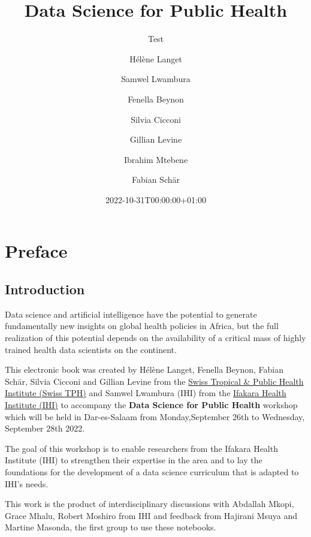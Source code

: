 \documentclass[
  letterpaper,
  DIV=11,
  numbers=noendperiod,
  oneside]{scrreprt}
\title{Data Science for Public Health}
\subtitle{Test}
\author{Hélène Langet \and Samwel Lwambura \and Fenella
Beynon \and Silvia Cicconi \and Gillian Levine \and Ibrahim
Mtebene \and Fabian Schär}
\date{2022-10-31T00:00:00+01:00}
\renewcommand*\contentsname{Table of contents}
\newcommand\contentsname{Table of contents}
\begin{document}
\maketitle
\ifdefined\Shaded\renewenvironment{Shaded}{\begin{tcolorbox}[borderline west={3pt}{0pt}{shadecolor}, frame hidden, breakable, boxrule=0pt, interior hidden, enhanced, sharp corners]}{\end{tcolorbox}}\fi

\renewcommand*\contentsname{Table of contents}
{
\hypersetup{linkcolor=}
\setcounter{tocdepth}{2}
\tableofcontents
}

\hypertarget{preface}{%
\chapter*{Preface}\label{preface}}

\hypertarget{introduction}{%
\section*{Introduction}\label{introduction}}

Data science and artificial intelligence have the potential to generate
fundamentally new insights on global health policies in Africa, but the
full realization of this potential depends on the availability of a
critical mass of highly trained health data scientists on the continent.

This electronic book was created by Hélène Langet, Fenella Beynon,
Fabian Schär, Silvia Cicconi and Gillian Levine from the
\href{https://www.swisstph.ch}{Swiss Tropical \& Public Health Institute
(Swiss TPH)} and Samwel Lwambura (IHI) from the
\href{https://ihi.or.tz/}{Ifakara Health Institute (IHI)} to accompany
the \textbf{Data Science for Public Health} workshop which will be held
in Dar-es-Salaam from Monday,September 26th to Wednesday, September 28th
2022.

The goal of this workshop is to enable researchers from the Ifakara
Health Institute (IHI) to strengthen their expertise in the area and to
lay the foundations for the development of a data science curriculum
that is adapted to IHI's needs.

This work is the product of interdisciplinary discussions with Abdallah
Mkopi, Grace Mhalu, Robert Moshiro from IHI and feedback from Hajirani
Msuya and Martine Masonda, the first group to use these notebooks.
\end{document}
